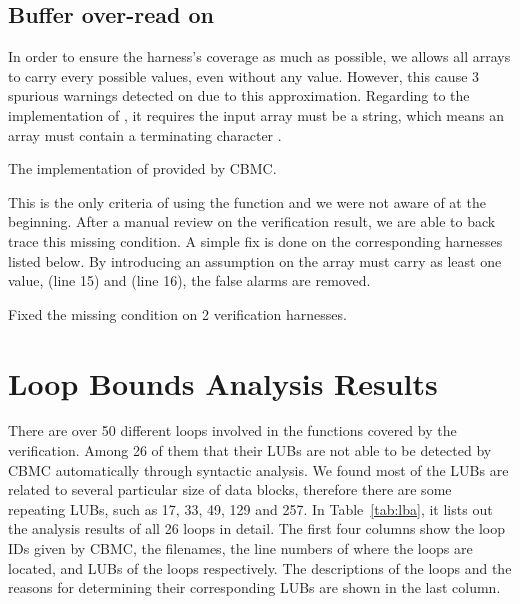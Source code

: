 \subsection{Buffer over-read on }
In order to ensure the harness's coverage as much as possible, we allows all  arrays to carry every possible values, even without any  value. However, this cause 3 spurious warnings detected on  due to this approximation. Regarding to the implementation of , it requires the input  array must be a string, which means an array must contain a terminating character .

\begin{listing}[ht]
\caption{The implementation of  provided by CBMC.}
\label{lst:strlen}
\end{listing}

This is the only criteria of using the function  and we were not aware of at the beginning. After a manual review on the verification result, we are able to back trace this missing condition. A simple fix is done on the corresponding harnesses listed below. By introducing an assumption on the  array must carry as least one  value,  (line 15) and  (line 16), the false alarms are removed.

\begin{listing}[ht]

\caption{Fixed the missing condition on 2 verification harnesses.}
\end{listing}

\section{Loop Bounds Analysis Results}
There are over 50 different loops involved in the functions covered by the verification. Among 26 of them that their LUBs are not able to be detected by CBMC automatically through syntactic analysis. We found most of the LUBs are related to several particular size of data blocks, therefore there are some repeating LUBs, such as 17, 33, 49, 129 and 257. In Table~\ref{tab:lba}, it lists out the analysis results of all 26 loops in detail. The first four columns show the loop IDs given by CBMC, the filenames, the line numbers of where the loops are located, and LUBs of the loops respectively. The descriptions of the loops and the reasons for determining their corresponding LUBs are shown in the last column. 

